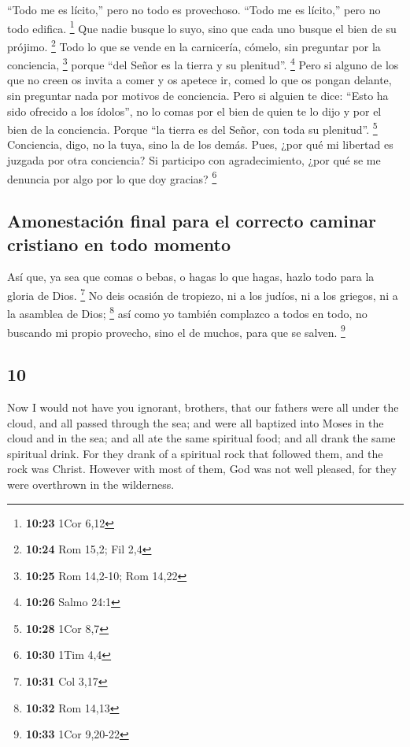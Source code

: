 \begin{paracol}{2}
 ``Todo me es lícito,'' pero no todo es provechoso.
``Todo me es lícito,'' pero no todo edifica. \footnote{\textbf{10:23}
  1Cor 6,12}  Que nadie busque lo suyo, sino que cada uno
busque el bien de su prójimo. \footnote{\textbf{10:24} Rom 15,2; Fil 2,4}
 Todo lo que se vende en la carnicería, cómelo, sin
preguntar por la conciencia, \footnote{\textbf{10:25} Rom 14,2-10; Rom
  14,22}  porque ``del Señor es la tierra y su
plenitud''. \footnote{\textbf{10:26} Salmo 24:1}  Pero si
alguno de los que no creen os invita a comer y os apetece ir, comed lo
que os pongan delante, sin preguntar nada por motivos de conciencia.
 Pero si alguien te dice: ``Esto ha sido ofrecido a los
ídolos'', no lo comas por el bien de quien te lo dijo y por el bien de
la conciencia. Porque ``la tierra es del Señor, con toda su plenitud''.
\footnote{\textbf{10:28} 1Cor 8,7}  Conciencia, digo, no
la tuya, sino la de los demás. Pues, ¿por qué mi libertad es juzgada por
otra conciencia?  Si participo con agradecimiento, ¿por
qué se me denuncia por algo por lo que doy gracias? \footnote{\textbf{10:30}
  1Tim 4,4}

\hypertarget{amonestaciuxf3n-final-para-el-correcto-caminar-cristiano-en-todo-momento}{%
\subsection{Amonestación final para el correcto caminar cristiano en
todo
momento}\label{amonestaciuxf3n-final-para-el-correcto-caminar-cristiano-en-todo-momento}}

 Así que, ya sea que comas o bebas, o hagas lo que hagas,
hazlo todo para la gloria de Dios. \footnote{\textbf{10:31} Col 3,17}
 No deis ocasión de tropiezo, ni a los judíos, ni a los
griegos, ni a la asamblea de Dios; \footnote{\textbf{10:32} Rom 14,13}
 así como yo también complazco a todos en todo, no
buscando mi propio provecho, sino el de muchos, para que se salven.
\footnote{\textbf{10:33} 1Cor 9,20-22}

\switchcolumn
\begin{otherlanguage}{english}

\hypertarget{section-19}{%
\section{10}\label{section-19}}

 Now I would not have you ignorant, brothers, that our
fathers were all under the cloud, and all passed through the sea;
 and were all baptized into Moses in the cloud and in the
sea;  and all ate the same spiritual food; 
and all drank the same spiritual drink. For they drank of a spiritual
rock that followed them, and the rock was Christ.  However
with most of them, God was not well pleased, for they were overthrown in
the wilderness.


\end{otherlanguage}
\end{paracol}

